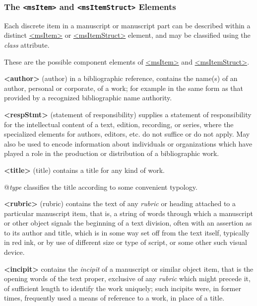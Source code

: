 \subsubsection[{The msItem and msItemStruct Elements}]{The \texttt{<msItem>} and \texttt{<msItemStruct>} Elements}\label{mscoit}\par
Each discrete item in a manuscript or manuscript part can be described within a distinct \hyperref[TEI.msItem]{<msItem>} or \hyperref[TEI.msItemStruct]{<msItemStruct>} element, and may be classified using the {\itshape class} attribute.\par
These are the possible component elements of \hyperref[TEI.msItem]{<msItem>} and \hyperref[TEI.msItemStruct]{<msItemStruct>}. 
\begin{sansreflist}
  
\item [\textbf{<author>}] (author) in a bibliographic reference, contains the name(s) of an author, personal or corporate, of a work; for example in the same form as that provided by a recognized bibliographic name authority.
\item [\textbf{<respStmt>}] (statement of responsibility) supplies a statement of responsibility for the intellectual content of a text, edition, recording, or series, where the specialized elements for authors, editors, etc. do not suffice or do not apply. May also be used to encode information about individuals or organizations which have played a role in the production or distribution of a bibliographic work.
\item [\textbf{<title>}] (title) contains a title for any kind of work.\hfil\\[-10pt]\begin{sansreflist}
    \item[@{\itshape type}]
  classifies the title according to some convenient typology.
\end{sansreflist}  
\item [\textbf{<rubric>}] (rubric) contains the text of any \textit{rubric} or heading attached to a particular manuscript item, that is, a string of words through which a manuscript or other object signals the beginning of a text division, often with an assertion as to its author and title, which is in some way set off from the text itself, typically in red ink, or by use of different size or type of script, or some other such visual device.
\item [\textbf{<incipit>}] contains the \textit{incipit} of a manuscript or similar object item, that is the opening words of the text proper, exclusive of any \textit{rubric} which might precede it, of sufficient length to identify the work uniquely; such incipits were, in former times, frequently used a means of reference to a work, in place of a title.

\end{sansreflist}

